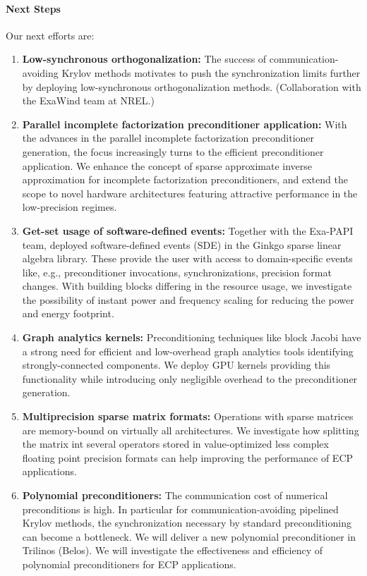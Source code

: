 \paragraph{Next Steps}


Our next efforts are:
\begin{enumerate}
	\item \textbf{Low-synchronous orthogonalization:} The success of 
	communication-avoiding Krylov methods motivates to push the synchronization 
	limits further by deploying low-synchronous orthogonalization methods.
        (Collaboration with the ExaWind team at NREL.)
	\item \textbf{Parallel incomplete factorization preconditioner 
	application:} With the advances in the parallel incomplete factorization
	preconditioner generation, the focus increasingly turns to the efficient 
	preconditioner application. We enhance the concept of sparse approximate 
	inverse approximation for incomplete factorization preconditioners, and 
	extend the scope to novel hardware architectures featuring attractive 
	performance in the low-precision regimes.
	\item \textbf{Get-set usage of software-defined events:} Together with the 
	Exa-PAPI team, deployed software-defined events (SDE) in the Ginkgo sparse 
	linear algebra library. These provide the user with access to 
	domain-specific events like, e.g., preconditioner invocations, 
	synchronizations, precision format changes. With building blocks differing 
	in the resource usage, we investigate the possibility of instant power and 
	frequency scaling for reducing the power and energy footprint.
	\item \textbf{Graph analytics kernels:} Preconditioning techniques like 
	block Jacobi have a strong need for efficient and low-overhead graph 
	analytics tools identifying strongly-connected components. We deploy GPU 
	kernels providing this functionality while introducing only negligible 
	overhead to the preconditioner generation.
	\item \textbf{Multiprecision sparse matrix formats:} Operations with sparse 
	matrices are memory-bound on virtually all architectures. We investigate 
	how splitting the matrix int several operators stored in value-optimized 
	less complex floating point precision formats can help improving the 
	performance of ECP applications.
	\item \textbf{Polynomial preconditioners:} The communication cost of 
	numerical preconditions is high. In particular for communication-avoiding 
	pipelined Krylov methods, the synchronization necessary by standard 
	preconditioning can become a bottleneck. We will deliver a new
        polynomial preconditioner in Trilinos (Belos). We will investigate the effectiveness 
	and efficiency of polynomial preconditioners for ECP applications.
\end{enumerate}
